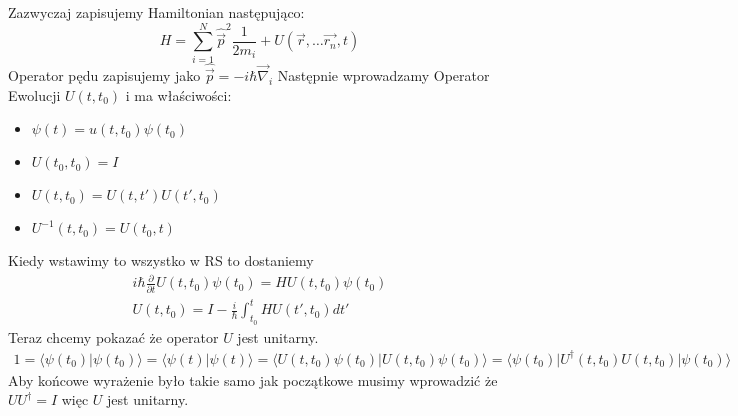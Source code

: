 Zazwyczaj zapisujemy Hamiltonian następująco:
$$  H=\sum_{i=1}^{N} \hat{\overrightarrow{p}}^{2} \frac{1}{2 m_{i}} + U\left(\vec{r}, \ldots \vec{r_{n}}, t\right)  $$
Operator pędu zapisujemy jako $\hat{\vec{p}} = -i \hbar \vec{\nabla}_i$
Następnie wprowadzamy Operator Ewolucji $U(t, t_0)$ i ma właściwości:
\begin{itemize}
	\item $  \psi(t)=u\left(t, t_{0}\right) \psi\left(t_{0}\right)  $
	\item $U(t_0, t_0) = I$
	\item $U(t, t_0) = U(t, t')U(t', t_0)$
	\item $U^{-1}(t, t_0) = U(t_0, t)$
\end{itemize}
Kiedy wstawimy to wszystko w RS to dostaniemy 
\begin{equation*}
	\begin{split}
		i \hbar \frac{\partial}{\partial t} U(t, t_0) \psi(t_0) = H U(t, t_0) \psi(t_0) \\
		U(t, t_0) = I - \frac{i}{\hbar} \int_{t_0}^t HU(t', t_0)dt'	
	\end{split}
\end{equation*}
Teraz chcemy pokazać że operator $U$ jest unitarny.
\begin{equation*}
	\begin{split}
		1=\langle\psi(t_{0}) | \psi(t_0)\rangle = \langle\psi(t) | \psi(t)\rangle = \langle U(t, t_0) \psi(t_0) | U(t, t_0) \psi(t_0) \rangle = \langle \psi(t_0) | U^{\dagger}(t, t_0) U(t, t_0)| \psi(t_0)  \rangle
	\end{split}
\end{equation*}
Aby końcowe wyrażenie było takie samo jak początkowe musimy wprowadzić że $U U^{\dagger} = I$ więc $U$ jest unitarny.

